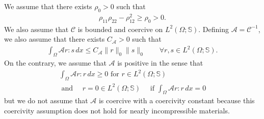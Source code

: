 \documentclass[10pt,letterpaper]{amsart}
\theoremstyle{plain} %
\theoremstyle{remark} %
\newcommand{\Cel}{\mathcal{C}} %
\newcommand{\Ael}{\mathcal{A}} %
\begin{document}
We assume that there exists $\rho_0>0$ such that 
%
\begin{align}
	\label{eq:rho-coercivity}
	\rho_{11}\rho_{22}-\rho_{12}^2 \ge \rho_0 >0.
\end{align}
%
We also assume that $\Cel$ is bounded and coercive on $L^2(\Omega; \mathbb{S})$. Defining $\Ael = \Cel^{-1}$, we also assume that there exists $C_{\Ael}>0$ such that 
%
\begin{align*}
	\int_{\Omega} \Ael r : s \,dx \le C_{\Ael} \| r\|_0 \|s\|_0 \qquad \forall r, s \in L^2(\Omega; \mathbb{S}) .
\end{align*}
%
On the contrary, we assume that $\Ael$ is positive in the sense that
%
\begin{multline}
	\label{eq:A-positive}
	\int_{\Omega} \Ael r : r \,dx \ge 0 \text{ for } r \in L^2(\Omega; \mathbb{S}) 
    \\
    \text{ and } \quad r = 0 \in L^2(\Omega; \mathbb{S}) \quad \text{ if } \int_{\Omega} \Ael r : r \,dx = 0 
\end{multline}
%
but we do not assume that $\Ael$ is coercive with a coercivity constant because this coercivity assumption does not hold for nearly incompressible materials.
\end{document}
